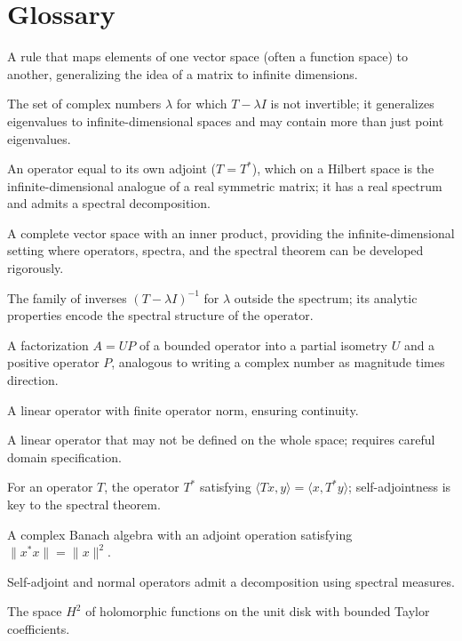 \section*{Glossary}
\begin{description}[leftmargin=*,style=nextline,itemsep=0.3em]
\item[\textbf{Operator.}] A rule that maps elements of one vector space (often a function space) to another, generalizing the idea of a matrix to infinite dimensions.
\item[\textbf{Spectrum.}] The set of complex numbers $\lambda$ for which $T-\lambda I$ is not invertible; it generalizes eigenvalues to infinite-dimensional spaces and may contain more than just point eigenvalues.
\item[\textbf{Self-adjoint operator.}] An operator equal to its own adjoint ($T=T^*$), which on a Hilbert space is the infinite-dimensional analogue of a real symmetric matrix; it has a real spectrum and admits a spectral decomposition.
\item[\textbf{Hilbert space.}] A complete vector space with an inner product, providing the infinite-dimensional setting where operators, spectra, and the spectral theorem can be developed rigorously.
\item[\textbf{Resolvent.}] The family of inverses $(T-\lambda I)^{-1}$ for $\lambda$ outside the spectrum; its analytic properties encode the spectral structure of the operator.
\item[\textbf{Polar decomposition.}] A factorization $A=UP$ of a bounded operator into a partial isometry $U$ and a positive operator $P$, analogous to writing a complex number as magnitude times direction.
\item[\textbf{Bounded operator.}] A linear operator with finite operator norm, ensuring continuity.
\item[\textbf{Unbounded operator.}] A linear operator that may not be defined on the whole space; requires careful domain specification.
\item[\textbf{Adjoint.}] For an operator $T$, the operator $T^*$ satisfying $\langle Tx,y\rangle=\langle x,T^*y\rangle$; self-adjointness is key to the spectral theorem.
\item[\textbf{C*-algebra.}] A complex Banach algebra with an adjoint operation satisfying $\|x^*x\|=\|x\|^2$.
\item[\textbf{Spectral theorem.}] Self-adjoint and normal operators admit a decomposition using spectral measures.
\item[\textbf{Hardy space.}] The space $H^2$ of holomorphic functions on the unit disk with bounded Taylor coefficients.
\end{description}

